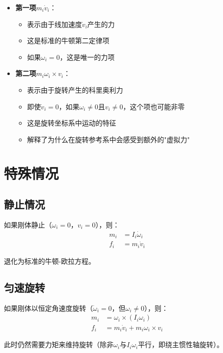 \documentclass[12pt,a4paper]{article}
\begin{document}
\begin{itemize}
\item \textbf{第一项$m_i \dot{v}_i$}：
\begin{itemize}
\item 表示由于线加速度$\dot{v}_i$产生的力
\item 这是标准的牛顿第二定律项
\item 如果$\omega_i = 0$，这是唯一的力项
\end{itemize}

\item \textbf{第二项$m_i \omega_i \times v_i$}：
\begin{itemize}
\item 表示由于旋转产生的科里奥利力
\item 即使$\dot{v}_i = 0$，如果$\omega_i \neq 0$且$v_i \neq 0$，这个项也可能非零
\item 这是旋转坐标系中运动的特征
\item 解释了为什么在旋转参考系中会感受到额外的"虚拟力"
\end{itemize}
\end{itemize}

\section{特殊情况}

\subsection{静止情况}

如果刚体静止（$\omega_i = 0$，$v_i = 0$），则：
\begin{align}
m_i &= I_i \dot{\omega}_i \\
f_i &= m_i \dot{v}_i
\end{align}

退化为标准的牛顿-欧拉方程。

\subsection{匀速旋转}

如果刚体以恒定角速度旋转（$\dot{\omega}_i = 0$，但$\omega_i \neq 0$），则：
\begin{align}
m_i &= \omega_i \times (I_i \omega_i) \\
f_i &= m_i \dot{v}_i + m_i \omega_i \times v_i
\end{align}

此时仍然需要力矩来维持旋转（除非$\omega_i$与$I_i \omega_i$平行，即绕主惯性轴旋转）。
\end{document}
